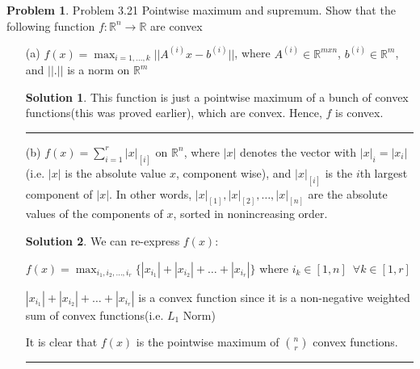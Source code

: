 \documentclass{article}
\theoremstyle{definition}
\newtheorem{problem}{Problem}
\def\fline{\rule{0.75\linewidth}{0.5pt}}
\newcommand{\finishline}{\begin{center}\fline\end{center}}
\newtheorem*{solution*}{Solution}
\newenvironment{solution}{\begin{solution*}}{{\finishline} \end{solution*}}
\begin{document}
\begin{problem} Problem 3.21
    {Pointwise maximum and supremum.} Show that the following function $f: \mathbb{R}^n \rightarrow \mathbb{R}$ are convex

    \begin{itemize}
        \item[(a)] $f(x) = \max_{i = 1, \dots, k} || A^{(i)}x - b^{(i)}||$, where $A^{(i)} \in \mathbb{R}^{m x n}$, $b^{(i)} \in \mathbb{R}^m$, and $||.||$ is a norm on $\mathbb{R}^m$

        \begin{solution}
            This function is just a pointwise maximum of a bunch of convex functions(this was proved earlier), which are convex. Hence, $f$ is convex. 
        \end{solution}

        \item[(b)] $f(x) = \sum_{i=1}^{r} |x|_{[i]}$ on $\mathbb{R}^n$, where $|x|$ denotes the vector with $|x|_i = |x_i|$ (i.e. $|x|$ is the absolute value $x$, component wise), and $|x|_{[i]}$ is the $i$th largest component of $|x|$.  In other words,  $|x|_{[1]}, |x|_{[2]}, \dots , |x|_{[n]}$ are the absolute values of the components of $x$, sorted in nonincreasing order.

        \begin{solution}
            We can re-express $f(x)$: \newline 

            $f(x) = \max_{i_1, i_2, \dots, i_r} \{|x_{i_1}| + |x_{i_2}| + \dots + |x_{i_r}|\}$ where $i_k \in [1, n] \enspace \forall k \in [1, r]$ \newline 

            $|x_{i_1}| + |x_{i_2}| + \dots + |x_{i_r}|$ is a convex function since it is a non-negative weighted sum of convex functions(i.e. $L_1$ Norm)

            It is clear that $f(x)$ is the pointwise maximum of $\binom{n}{r}$ convex functions. 

            
        \end{solution}
    \end{itemize}
\end{problem}
\end{document}
